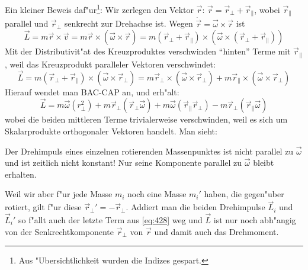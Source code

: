 Ein kleiner Beweis daf"ur\footnote{Aus "Ubersichtlichkeit wurden die
  Indizes gespart.}: Wir zerlegen den Vektor $\vec r$: $\vec r = \vec
r_\bot + \vec r_\|$, wobei $\vec r_\|$ parallel und $\vec r_\bot$
senkrecht zur Drehachse ist. Wegen $\dot{\vec r} = \vec \omega \times
\vec r$ ist 
$$
\vec L = m \vec r \times \vec v = m \vec r \times (\vec
\omega \times \vec r) = m (\vec r_\bot + \vec r_\|) \times (\vec
\omega \times (\vec r_\bot + \vec r_\|))
$$
Mit der Distributivit"at des Kreuzproduktes verschwinden "`hinten"'
Terme mit $\vec r_\|$, weil das Kreuzprodukt paralleler Vektoren
verschwindet:
$$
\vec L = m (\vec r_\bot + \vec r_\|) \times (\vec \omega \times \vec
r_\bot)
=
 m \vec r_\bot \times (\vec \omega \times \vec r_\bot)
+
 m  \vec r_\| \times (\vec \omega \times \vec r_\bot)
$$
Hierauf wendet man BAC-CAP an, und erh"alt:
\begin{equation}
   \label{eq:428}
\vec L = m\vec \omega (r_\bot^2) + m\vec r_\bot (\vec r_\bot \vec
\omega) + m\vec\omega(\vec r_\| \vec r_\bot) - m\vec r_\bot(\vec r_\| \vec \omega)   
\end{equation}
wobei die beiden mittleren Terme trivialerweise verschwinden, weil es
sich um Skalarprodukte orthogonaler Vektoren handelt. Man sieht:
\begin{Wichtig}
   Der Drehimpuls eines einzelnen rotierenden Massenpunktes ist nicht
   parallel zu $\vec \omega$ und ist zeitlich nicht konstant! Nur
   seine Komponente parallel zu $\vec \omega$ bleibt erhalten.
\end{Wichtig}
Weil wir aber f"ur jede Masse $m_i$ noch eine Masse $m_i'$ haben, die
gegen"uber rotiert, gilt f"ur diese $\vec r_\bot' = - \vec
r_\bot$. Addiert man die beiden Drehimpulse $\vec L_i$ und $\vec L_i'$
so f"allt auch der letzte Term aus \eqref{eq:428} weg und $\vec L$ ist
nur noch abh"angig von der Senkrechtkomponente $\vec r_\bot$ von $\vec
r$ und damit auch das Drehmoment.

